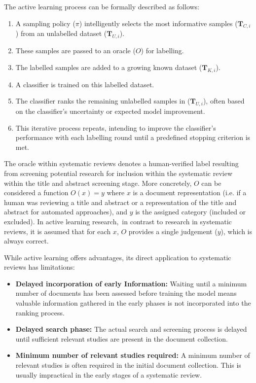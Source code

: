 \documentclass[10pt,oneside]{book}
\begin{document}
\begin{tcolorbox}[title=The General Active Learning Process]  
\small
The active learning process can be formally described as follows:

\begin{enumerate}
    \item A sampling policy ($\pi$) intelligently selects the most informative samples ($\mathbf{T}_{C,i}$) from an unlabelled dataset ($\mathbf{T}_{U,i}$).
    \item These samples are passed to an oracle ($O$) for labelling.
    \item The labelled samples are added to a growing known dataset ($\mathbf{T}_{K,i}$).
    \item A classifier is trained on this labelled dataset.
    \item The classifier ranks the remaining unlabelled samples in ($\mathbf{T}_{U,i}$), often based on the classifier's uncertainty or expected model improvement.
    \item This iterative process repeats, intending to improve the classifier's performance with each labelling round until a predefined stopping criterion is met.
\end{enumerate}
\end{tcolorbox}
The oracle within systematic reviews denotes a human-verified label resulting from screening potential research for inclusion within the systematic review within the title and abstract screening stage. More concretely, $O$ can be considered a function $O(x) = y$ where $x$ is a document representation (i.e. if a human was reviewing a title and abstract or a representation of the title and abstract for automated approaches), and $y$ is the assigned category (included or excluded). In active learning research, in contrast to research in systematic reviews, it is assumed that for each $x$, $O$ provides a single judgement ($y$), which is always correct.




While active learning offers advantages, its direct application to systematic reviews has limitations:

\begin{itemize}
    \item \textbf{Delayed incorporation of early Information:} Waiting until a minimum number of documents has been assessed before training the model means valuable information gathered in the early phases is not incorporated into the ranking process.
    \item \textbf{Delayed search phase:} The actual search and screening process is delayed until sufficient relevant studies are present in the document collection.
    \item \textbf{Minimum number of relevant studies required:} A minimum number of relevant studies is often required in the initial document collection. This is usually impractical in the early stages of a systematic review.
\end{itemize}
\end{document}
